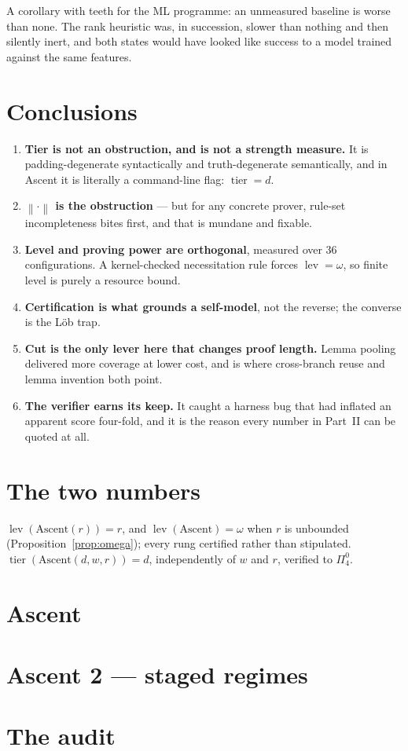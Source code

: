 \documentclass[11pt,a4paper]{article}
\newcommand{\Pai}[2]{\Pi^{#1}_{#2}}
\newcommand{\shortest}[1]{\left\lVert #1 \right\rVert}
\newcommand{\lev}{\operatorname{lev}}
\newcommand{\tier}{\operatorname{tier}}
\begin{document}
A corollary with teeth for the ML programme: an unmeasured baseline is worse
than none. The rank heuristic was, in succession, slower than nothing and then
silently inert, and both states would have looked like success to a model
trained against the same features.

\section{Conclusions}

\begin{enumerate}
\item \textbf{Tier is not an obstruction, and is not a strength measure.} It is
padding-degenerate syntactically and truth-degenerate semantically, and in
Ascent it is literally a command-line flag: $\tier = d$.
\item \textbf{$\shortest{\cdot}$ is the obstruction} --- but for any concrete
prover, rule-set incompleteness bites first, and that is mundane and fixable.
\item \textbf{Level and proving power are orthogonal}, measured over 36
configurations. A kernel-checked necessitation rule forces $\lev = \omega$, so
finite level is purely a resource bound.
\item \textbf{Certification is what grounds a self-model}, not the reverse; the
converse is the L\"ob trap.
\item \textbf{Cut is the only lever here that changes proof length.} Lemma
pooling delivered more coverage at lower cost, and is where cross-branch reuse
and lemma invention both point.
\item \textbf{The verifier earns its keep.} It caught a harness bug that had
inflated an apparent score four-fold, and it is the reason every number in
Part~II can be quoted at all.
\end{enumerate}

\appendix
\section{The two numbers}

$\lev(\text{Ascent}(r)) = r$, and $\lev(\text{Ascent}) = \omega$ when $r$ is
unbounded (Proposition~\ref{prop:omega}); every rung certified rather than
stipulated. $\tier(\text{Ascent}(d,w,r)) = d$, independently of $w$ and $r$,
verified to $\Pai{0}{4}$.

\section{Ascent}\label{app:ascent}


\section{Ascent 2 --- staged regimes}\label{app:ascent2}


\section{The audit}\label{app:audit}

\end{document}
